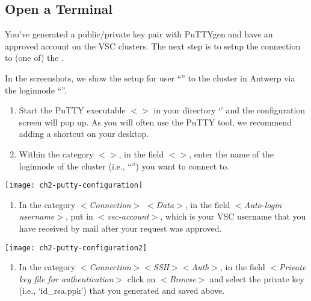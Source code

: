   \subsection{Open a Terminal}
  \label{sec:windows-open-a-terminal}

  You've generated a public/private key pair with PuTTYgen and have an approved
  account on the VSC clusters.  The next step is to setup the connection to (one
  of) the \hpc.

  In the screenshots, we show the setup for user ``''
  to the \hpc cluster in Antwerp via the loginnode
  ``\strong{\emph{\loginnode}}''.

  \begin{enumerate}
    \item  Start the PuTTY executable $<$$>$ in your
      directory `' and the
      configuration screen will pop up. As you will often use the PuTTY tool,
      we recommend adding a shortcut on your desktop.
    \item  Within the category $<$$>$, in the field
      $<$$>$, enter the name of the loginnode of the
      \hpc cluster (i.e., ``\strong{\emph{\loginnode}}'')
      you want to connect to.
  \end{enumerate}

  \texttt{[image: ch2-putty-configuration]}

  \begin{enumerate}
    \item  In the category $<$\emph{Connection}$>$ $<$\emph{Data}$>$, in
      the field $<$\emph{Auto-login username}$>$, put in
      $<$\emph{vsc-account}$>$, which is your VSC username that you have
      received by mail after your request was approved.
  \end{enumerate}

  \texttt{[image: ch2-putty-configuration2]}

  \begin{enumerate}
    \item  In the category $<$\emph{Connection$>$$<$SSH$>$$<$Auth$>$}, in the
      field $<$\emph{Private key file for authentication}$>$ click on
      $<$\emph{Browse}$>$ and select the private key (i.e., `id\_rsa.ppk')
      that you generated and saved above.
  \end{enumerate}

